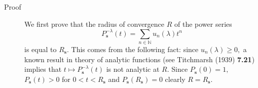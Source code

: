 \documentclass[a4paper,oneside,notitlepage]{article}%
\begin{document}
\begin{description}
\item[Proof] We first prove that the radius of convergence $R$ of the power
series%
\begin{equation}
P_{\mathbf{s}}^{-\lambda}\left(  t\right)  =%
{\displaystyle\sum\limits_{n\in\mathbb{N}}}
u_{n}\left(  \lambda\right)  t^{n} \label{radiusR}%
\end{equation}
\newline is equal to $R_{\mathbf{s}}.$ This comes from the following fact:
since $u_{n}\left(  \lambda\right)  \geqslant0,$ a known result in theory of
analytic functions (see Titchmarsh (1939) \textbf{7.21}) implies that
$t\mapsto P_{\mathbf{s}}^{-\lambda}\left(  t\right)  $ is not analytic at $R.$
Since $P_{\mathbf{s}}\left(  0\right)  =1,$ $P_{\mathbf{s}}\left(  t\right)
>0$ for $0<t<R_{\mathbf{s}}$ and $P_{\mathbf{s}}\left(  R_{\mathbf{s}}\right)
=0$ clearly $R=R_{\mathbf{s}}.$


\end{description}
\end{document}
